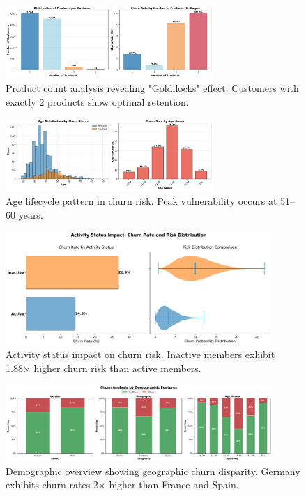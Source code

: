 \documentclass[12pt]{article}
\begin{document}
\begin{figure}[H]
\centering
\includegraphics[width=0.7\textwidth]{img/04_products_churn_analysis.png}
\caption{Product count analysis revealing "Goldilocks" effect. Customers with exactly 2 products show optimal retention.}
\label{fig:products}
\end{figure}

\begin{figure}[H]
\centering
\includegraphics[width=0.7\textwidth]{img/03_age_distribution_churn.png}
\caption{Age lifecycle pattern in churn risk. Peak vulnerability occurs at 51–60 years.}
\label{fig:age}
\end{figure}

\begin{figure}[H]
\centering
\includegraphics[width=0.9\textwidth]{img/08_churn_rate_violin_hybridv2.png}
\caption{Activity status impact on churn risk. Inactive members exhibit 1.88× higher churn risk than active members.}
\label{fig:active}
\end{figure}

\begin{figure}[H]
\centering
\includegraphics[width=0.9\textwidth]{img/02_demographic_overview.png}
\caption{Demographic overview showing geographic churn disparity. Germany exhibits churn rates 2× higher than France and Spain.}
\label{fig:geography}
\end{figure}
\end{document}
